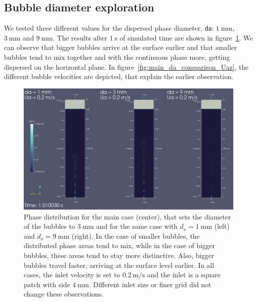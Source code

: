 \documentclass[11pt, a4paper, twoside]{article}
\begin{document}
\subsection{Bubble diameter exploration}
We tested three different values for the dispersed phase diameter, \texttt{da}: $\SI{1}{\milli\metre}$, $\SI{3}{\milli\metre}$ and $\SI{9}{\milli\metre}$. The results after $\SI{1}{\second}$ of simulated time are shown in figure~\ref{fig:main_da_comparison}. We can observe that bigger bubbles arrive at the surface earlier and that smaller bubbles tend to mix together and with the continuous phase more, getting dispersed on the horizontal plane. In figure~\ref{fig:main_da_comparison_Uaz}, the different bubble velocities are depicted, that explain the earlier observation.

\begin{figure}
    \centering
    \includegraphics[width=\textwidth]{figures/main/da_comparison_1_3_9}
    \caption{Phase distribution for the main case (center), that sets the diameter of the bubbles to $\SI{3}{\milli\metre}$ and for the same case with $d_\mathrm{a}=\SI{1}{\milli\metre}$ (left) and $d_\mathrm{a}=\SI{9}{\milli\metre}$ (right). In the case of smaller bubbles, the distributed phase areas tend to mix, while in the case of bigger bubbles, these areas tend to stay more distinctive. Also, bigger bubbles travel faster, arriving at the surface level earlier. In all cases, the inlet velocity is set to $\SI{0.2}{\metre/\second}$ and the inlet is a square patch with side $\SI{4}{\milli\metre}$. Different inlet size or finer grid did not change these observations.}
    \label{fig:main_da_comparison}
\end{figure}
\end{document}
